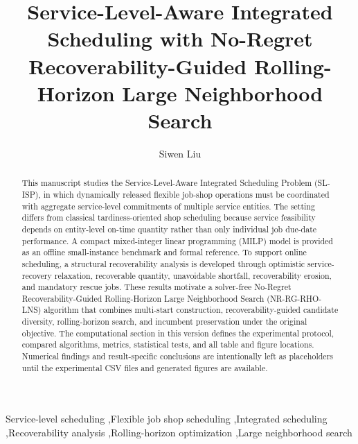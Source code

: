 \documentclass[a4paper,fleqn]{cas-sc}
\begin{document}
\let\WriteBookmarks\relax
\def\floatpagepagefraction{1}
\def\textpagefraction{.001}


\title[mode=title]{Service-Level-Aware Integrated Scheduling with No-Regret Recoverability-Guided Rolling-Horizon Large Neighborhood Search}

\author[1]{Siwen Liu}
\cormark[1]


\begin{abstract}
This manuscript studies the Service-Level-Aware Integrated Scheduling Problem (SL-ISP), in which dynamically released flexible job-shop operations must be coordinated with aggregate service-level commitments of multiple service entities. The setting differs from classical tardiness-oriented shop scheduling because service feasibility depends on entity-level on-time quantity rather than only individual job due-date performance. A compact mixed-integer linear programming (MILP) model is provided as an offline small-instance benchmark and formal reference. To support online scheduling, a structural recoverability analysis is developed through optimistic service-recovery relaxation, recoverable quantity, unavoidable shortfall, recoverability erosion, and mandatory rescue jobs. These results motivate a solver-free No-Regret Recoverability-Guided Rolling-Horizon Large Neighborhood Search (NR-RG-RHO-LNS) algorithm that combines multi-start construction, recoverability-guided candidate diversity, rolling-horizon search, and incumbent preservation under the original objective. The computational section in this version defines the experimental protocol, compared algorithms, metrics, statistical tests, and all table and figure locations. Numerical findings and result-specific conclusions are intentionally left as placeholders until the experimental CSV files and generated figures are available.
\end{abstract}

\begin{keywords}
Service-level scheduling \sep Flexible job shop scheduling \sep Integrated scheduling \sep Recoverability analysis \sep Rolling-horizon optimization \sep Large neighborhood search
\end{keywords}
\end{document}
